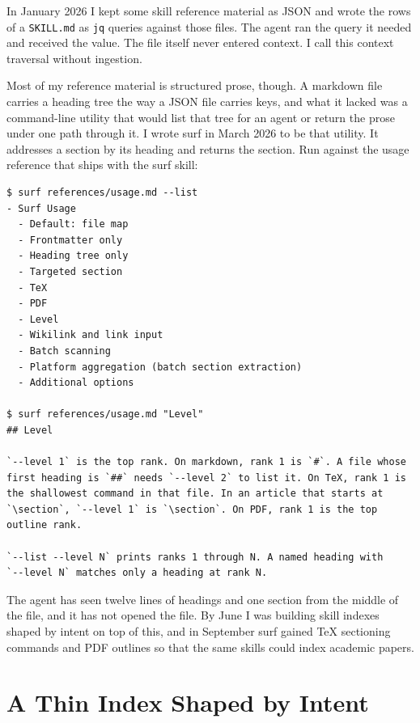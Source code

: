 \documentclass[11pt]{article}
\begin{document}
In January 2026 I kept some skill reference material as JSON and wrote the rows
of a \texttt{SKILL.md} as \texttt{jq} queries against those files. The agent ran
the query it needed and received the value. The file itself never entered
context. I call this context traversal without ingestion.

Most of my reference material is structured prose, though. A markdown file
carries a heading tree the way a JSON file carries keys, and what it lacked was a
command-line utility that would list that tree for an agent or return the prose
under one path through it. I wrote surf in March 2026 to be that utility. It
addresses a section by its heading and returns the section. Run against the
usage reference that ships with the surf skill:

\begin{Verbatim}
$ surf references/usage.md --list
- Surf Usage
  - Default: file map
  - Frontmatter only
  - Heading tree only
  - Targeted section
  - TeX
  - PDF
  - Level
  - Wikilink and link input
  - Batch scanning
  - Platform aggregation (batch section extraction)
  - Additional options

$ surf references/usage.md "Level"
## Level

`--level 1` is the top rank. On markdown, rank 1 is `#`. A file whose
first heading is `##` needs `--level 2` to list it. On TeX, rank 1 is
the shallowest command in that file. In an article that starts at
`\section`, `--level 1` is `\section`. On PDF, rank 1 is the top
outline rank.

`--list --level N` prints ranks 1 through N. A named heading with
`--level N` matches only a heading at rank N.
\end{Verbatim}

The agent has seen twelve lines of headings and one section from the middle of
the file, and it has not opened the file. By June I was building skill indexes
shaped by intent on top of this, and in September surf gained TeX sectioning
commands and PDF outlines so that the same skills could index academic papers.

\section{A Thin Index Shaped by Intent}
\end{document}
